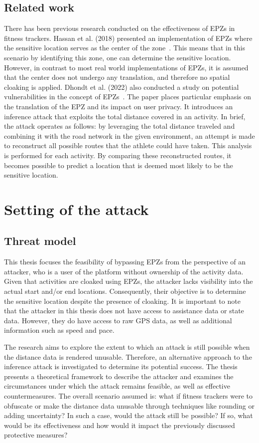 \documentclass[conference]{IEEEtran}
\begin{document}
\subsection{Related work}
There has been previous research conducted on the effectiveness of EPZs in
fitness trackers. Hassan et al. (2018) presented an implementation of EPZs
where the sensitive location serves as the center of the
zone~\cite{sec18has3:online}. This means that in this scenario by identifying
this zone, one can determine the sensitive location. However, in contrast to
most real world implementations of EPZs, it is assumed that the center does not
undergo any translation, and therefore no spatial cloaking is applied. Dhondt
et al. (2022) also conducted a study on potential vulnerabilities in the
concept of EPZs~\cite{Dhondt}. The paper places particular emphasis on the
translation of the EPZ and its impact on user privacy. It introduces an
inference attack that exploits the total distance covered in an activity. In
brief, the attack operates as follows: by leveraging the total distance
traveled and combining it with the road network in the given environment, an
attempt is made to reconstruct all possible routes that the athlete could have
taken. This analysis is performed for each activity. By comparing these
reconstructed routes, it becomes possible to predict a location that is deemed
most likely to be the sensitive location.

\section{\textbf{Setting of the attack}}
\subsection{Threat model}
This thesis focuses the feasibility of bypassing EPZs from the perspective of
an attacker, who is a user of the platform without ownership of the activity
data. Given that activities are cloaked using EPZs, the attacker lacks
visibility into the actual start and/or end locations. Consequently, their
objective is to determine the sensitive location despite the presence of
cloaking. It is important to note that the attacker in this thesis does not
have access to assistance data or state data. However, they do have access to
raw GPS data, as well as additional information such as speed and pace.

The research aims to explore the extent to which an attack is still possible
when the distance data is rendered unusable. Therefore, an alternative approach
to the inference attack is investigated to determine its potential success. The
thesis presents a theoretical framework to describe the attacker and examines
the circumstances under which the attack remains feasible, as well as effective
countermeasures. The overall scenario assumed is: what if fitness trackers were
to obfuscate or make the distance data unusable through techniques like
rounding or adding uncertainty? In such a case, would the attack still be
possible? If so, what would be its effectiveness and how would it impact the
previously discussed protective measures?
\end{document}
